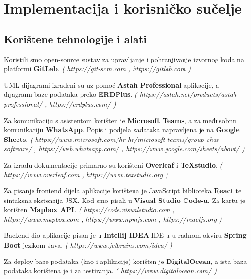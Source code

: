 \chapter{Implementacija i korisničko sučelje}

    \section{Korištene tehnologije i alati}

    Koristili smo open-source sustav za upravljanje i pohranjivanje izvornog koda na platformi \textbf{GitLab}. \textit{( https://git-scm.com , https://gitlab.com )} \newline
    
    UML dijagrami izrađeni su uz pomoć \textbf{Astah Professional} aplikacije, a dijagrami baze podataka preko \textbf{ERDPlus}. \textit{( https://astah.net/products/astah-professional/ , https://erdplus.com/ )} \newline 
    
    Za komunikaciju s asistentom korišten je \textbf{Microsoft Teams}, a za međusobnu komunikaciju \textbf{WhatsApp}. Popis i podjela zadataka napravljena je na \textbf{Google Sheets}. \textit{( https://www.microsoft.com/hr-hr/microsoft-teams/group-chat-software/ , https://web.whatsapp.com/ , https://www.google.com/sheets/about/ )} \newline

    Za izradu dokumentacije primarno su korišteni \textbf{Overleaf} i \textbf{TeXstudio}. \textit{( https://www.overleaf.com , https://www.texstudio.org )} \newline
    
    Za pisanje frontend dijela aplikacije korištena je JavaScript biblioteka \textbf{React} te sintaksna ekstenzija JSX. Kod smo pisali u \textbf{Visual Studio Code-u}. Za kartu je korišten \textbf{Mapbox API}. \textit{( https://code.visualstudio.com , https://www.mapbox.com , https://www.npmjs.com , https://reactjs.org )} \newline
    
    Backend dio aplikacije pisan je u \textbf{Intellij IDEA} IDE-u u radnom okviru \textbf{Spring Boot} jezikom Java. \textit{( https://www.jetbrains.com/idea/ )} \newline

    Za deploy baze podataka (kao i aplikacije) korišten je \textbf{DigitalOcean}, a ista baza podataka korištena je i za testiranja. \textit{( https://www.digitalocean.com/ )}

